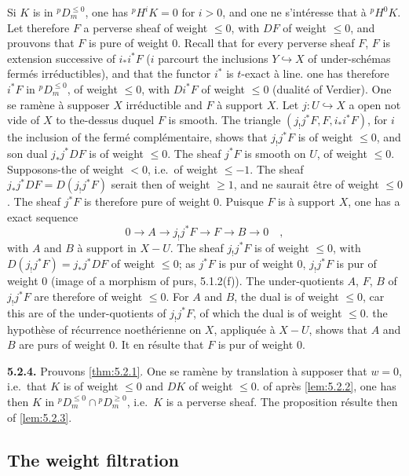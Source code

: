 \documentclass[12pt,a4paper]{article}
\theoremstyle{plain}
\theoremstyle{definition}
\newcommand{\into}{\hookrightarrow}
\begin{document}
{{Si $K$ is in ${}^{p}D_{m}^{\leq 0}$, one has ${}^{p}H^{i}K = 0$ for $i > 0$, and one ne s'int\'{e}resse that \`{a} ${}^{p}H^{0}K$. Let therefore $F$ a perverse sheaf of weight $\leq 0$, with $DF$ of weight $\leq 0$, and prouvons that $F$ is pure of weight $0$. Recall that for every perverse sheaf $F$, $F$ is extension successive of $i_{*}i^{*}F$ ($i$ parcourt the inclusions $Y \into X$ of under-sch\'{e}mas ferm\'{e}s irr\'{e}ductibles), and that the functor $i^{*}$ is $t$-exact \`{a} line. one has therefore $i^{*}F$ in ${}^{p}D_{m}^{\leq 0}$, of weight $\leq 0$, with $Di^{*}F$ of weight $\leq 0$ (dualit\'{e} of Verdier). One se ram\`{e}ne \`{a} supposer $X$ irr\'{e}ductible and $F$ \`{a} support $X$. Let $j: U \into X$ a open not vide of $X$ to the-dessus duquel $F$ is smooth. The triangle $(j_{!}j^{*}F, F, i_{*}i^{*}F)$, for $i$ the inclusion of the ferm\'{e} compl\'{e}mentaire, shows that $j_{!}j^{*}F$ is of weight $\leq 0$, and son dual $j_{*}j^{*}DF$ is of weight $\leq 0$. The sheaf $j^{*}F$ is smooth on $U$, of weight $\leq 0$. Supposons-the of weight $< 0$, i.e.\ of weight $\leq -1$. The sheaf $j_{*}j^{*}DF = D(j_{!}j^{*}F)$ serait then of weight $\geq 1$, and ne saurait \^{e}tre of weight $\leq 0$. The sheaf $j^{*}F$ is therefore pure of weight $0$. Puisque $F$ is \`{a} support $X$, one has a exact sequence
\[
0 \longrightarrow A \longrightarrow j_{!}j^{*}F \longrightarrow F \longrightarrow B \longrightarrow 0\quad,
\]
with $A$ and $B$ \`{a} support in $X-U$. The sheaf $j_{!}j^{*}F$ is of weight $\leq 0$, with $D(j_{!}j^{*}F) = j_{*}j^{*}DF$ of weight $\leq 0$; as $j^{*}F$ is pur of weight $0$, $j_{!}j^{*}F$ is pur of weight $0$ (image of a morphism of purs, 5.1.2(f)). The under-quotients $A$, $F$, $B$ of $j_{!}j^{*}F$ are therefore of weight $\leq 0$. For $A$ and $B$, the dual is of weight $\leq 0$, car this are of the under-quotients of $j_{!}j^{*}F$, of which the dual is of weight $\leq 0$. the hypoth\`{e}se of r\'{e}currence noeth\'{e}rienne on $X$, appliqu\'{e}e \`{a} $X-U$, shows that $A$ and $B$ are purs of weight $0$. It en r\'{e}sulte that $F$ is pur of weight $0$.

\noindent\textbf{5.2.4.} Prouvons \ref{thm:5.2.1}. One se ram\`{e}ne by translation \`{a} supposer that $w = 0$, i.e.\ that $K$ is of weight $\leq 0$ and $DK$ of weight $\leq 0$. of apr\`{e}s \ref{lem:5.2.2}, one has then $K$ in ${}^{p}D_{m}^{\leq 0} \cap {}^{p}D_{m}^{\geq 0}$, i.e.\ $K$ is a perverse sheaf. The proposition r\'{e}sulte then of \ref{lem:5.2.3}.

\subsection{The weight filtration}

}}
\end{document}
